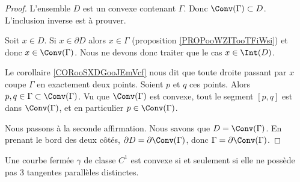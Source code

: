 \begin{proof}
    L'ensemble \( D\) est un convexe contenant \( \Gamma\). Donc \( \Conv(\Gamma)\subset D\). L'inclusion inverse est à prouver.
    
    Soit \( x\in D\). Si \( x\in \partial D\) alors \( x\in \Gamma\) (proposition \ref{PROPooWZITooTFiWsi}) et donc \( x\in\Conv(\Gamma)\). Nous ne devons donc traiter que le cas \( x\in\Int(D)\).
    
    Le corollaire \ref{CORooSXDGooJEmVcf} nous dit que toute droite passant par \( x\) coupe \( \Gamma\) en exactement deux points. Soient \( p\) et \( q\) ces points. Alors \( p,q\in \Gamma\subset \Conv(\Gamma)\). Vu que \( \Conv(\Gamma) \) est convexe, tout le segment \( [p,q]\) est dans \( \Conv(\Gamma)\), et en particulier \( p\in\Conv(\Gamma)\).

    Nous passons à la seconde affirmation. Nous savons que \( D=\Conv(\Gamma)\). En prenant le bord des deux côtés, \( \partial D=\partial\Conv(\Gamma)\), donc \( \Gamma=\partial\Conv(\Gamma)\).
\end{proof}

\begin{lemma}        \label{LEMooUEKQooWhGyKn}
    Une courbe fermée \( \gamma\) de classe \( C^1\) est convexe si et seulement si elle ne possède pas \( 3\) tangentes parallèles distinctes.
\end{lemma}

